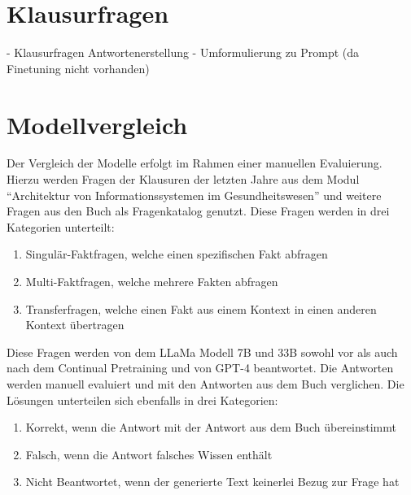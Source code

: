 \section{Klausurfragen}
- Klausurfragen Antwortenerstellung
- Umformulierung zu Prompt (da Finetuning nicht vorhanden)

\section{Modellvergleich}
Der Vergleich der Modelle erfolgt im Rahmen einer manuellen Evaluierung.
Hierzu werden Fragen der Klausuren der letzten Jahre aus dem Modul \enquote{Architektur von Informationssystemen im Gesundheitswesen} und weitere Fragen aus den Buch \citet{bb} als Fragenkatalog genutzt.
Diese Fragen werden in drei Kategorien unterteilt:
\begin{enumerate}
    \item Singulär-Faktfragen, welche einen spezifischen Fakt abfragen
    \item Multi-Faktfragen, welche mehrere Fakten abfragen
    \item Transferfragen, welche einen Fakt aus einem Kontext in einen anderen Kontext übertragen
\end{enumerate}
Diese Fragen werden von dem LLaMa Modell 7B und 33B sowohl vor als auch nach dem Continual Pretraining und von GPT-4 beantwortet.
Die Antworten werden manuell evaluiert und mit den Antworten aus dem Buch \citet{bb} verglichen.
Die Lösungen unterteilen sich ebenfalls in drei Kategorien:
\begin{enumerate}
    \item Korrekt, wenn die Antwort mit der Antwort aus dem Buch übereinstimmt
    \item Falsch, wenn die Antwort falsches Wissen enthält
    \item Nicht Beantwortet, wenn der generierte Text keinerlei Bezug zur Frage hat
\end{enumerate}

